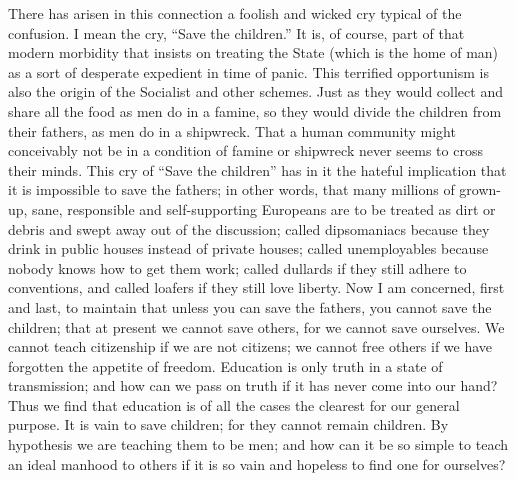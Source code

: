 \documentclass{book}
\begin{document}
There has arisen in this connection a foolish and wicked cry typical of the confusion. I mean the cry, “Save the children.” It is, of course, part of that modern morbidity that insists on treating the State (which is the home of man) as a sort of desperate expedient in time of panic. This terrified opportunism is also the origin of the Socialist and other schemes. Just as they would collect and share all the food as men do in a famine, so they would divide the children from their fathers, as men do in a shipwreck. That a human community might conceivably not be in a condition of famine or shipwreck never seems to cross their minds. This cry of “Save the children” has in it the hateful implication that it is impossible to save the fathers; in other words, that many millions of grown-up, sane, responsible and self-supporting Europeans are to be treated as dirt or debris and swept away out of the discussion; called dipsomaniacs because they drink in public houses instead of private houses; called unemployables because nobody knows how to get them work; called dullards if they still adhere to conventions, and called loafers if they still love liberty. Now I am concerned, first and last, to maintain that unless you can save the fathers, you cannot save the children; that at present we cannot save others, for we cannot save ourselves. We cannot teach citizenship if we are not citizens; we cannot free others if we have forgotten the appetite of freedom. Education is only truth in a state of transmission; and how can we pass on truth if it has never come into our hand? Thus we find that education is of all the cases the clearest for our general purpose. It is vain to save children; for they cannot remain children. By hypothesis we are teaching them to be men; and how can it be so simple to teach an ideal manhood to others if it is so vain and hopeless to find one for ourselves?
\end{document}
